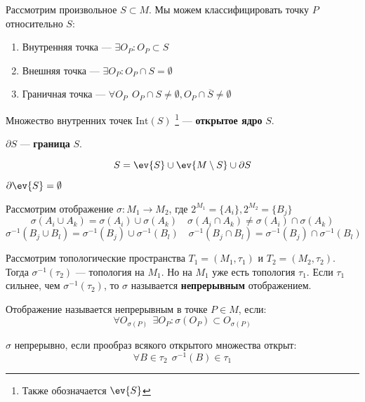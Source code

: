 Рассмотрим произвольное \(S \subset M\). Мы можем классифицировать точку \(P\) относительно  \(S\):
 \begin{enumerate}
     \item Внутренняя точка --- \(\exists O_P : O_P \subset S\)
     \item Внешняя точка --- \(\exists O_P : O_P \cap S = \emptyset\)
    \item Граничная точка --- \(\forall O_P \ \ O_P \cap S \neq \emptyset, O_P \cap \overline{S} \neq \emptyset\)
\end{enumerate}

\begin{definition}
    Множество внутренних точек \(\mathrm{Int}(S)\)
    \footnote{Также обозначается \(\ev{S}\)} --- \textbf{открытое ядро} \(S\). 

    \(\partial S\) --- \textbf{граница} \(S\).
\end{definition}

\[S = \ev{S} \cup \ev{M \setminus S} \cup \partial S\] 

\begin{remark}
    \(\partial \ev{S} = \emptyset\) 
\end{remark}

Рассмотрим отображение \(\sigma : M_1 \to M_2\),
где \(2^{M_1} = \{A_i\}, 2^{M_2} = \{B_j\}\)
\[\sigma(A_i \cup A_k) = \sigma(A_i) \cup \sigma(A_k)
\quad \sigma(A_i \cap A_k) \neq \sigma(A_i) \cap \sigma(A_k)\] 
\[\sigma^{-1}(B_j \cup B_l) = \sigma^{-1}(B_j) \cup \sigma^{-1}(B_l)
 \quad \sigma^{-1}(B_j \cap B_l) = \sigma^{-1}(B_j) \cap \sigma^{-1}(B_l)\] 

\begin{definition}
    Рассмотрим топологические пространства \(T_1 = (M_1, \tau_1)\) и \(T_2 = (M_2, \tau_2)\).
    Тогда \(\sigma^{-1}(\tau_2)\) --- топология на \(M_1\).
    Но на \(M_1\) уже есть топология \(\tau_1\).
    Если \(\tau_1\) сильнее, чем \(\sigma^{-1}(\tau_2)\), то \(\sigma\) называется \textbf{непрерывным} отображением.
\end{definition}

\begin{definition}
    Отображение называется непрерывным в точке \(P \in M\), если:
     \[\forall O_{\sigma(P)} \ \ \exists O_P : \sigma(O_P) \subset O_{\sigma(P)}\] 
\end{definition}

\begin{definition}
    \(\sigma\) непрерывно, если прообраз всякого открытого множества открыт:
    \[\forall B \in \tau_2 \ \ \sigma^{-1}(B) \in \tau_1\] 
\end{definition}

